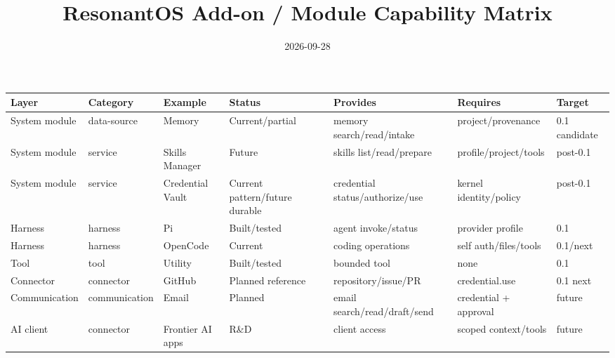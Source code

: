 \documentclass[10pt,landscape]{article}
\title{ResonantOS Add-on / Module Capability Matrix}\date{2026-09-28}
\begin{document}
\maketitle
\small
\begin{longtable}{p{2.2cm}p{2cm}p{2.6cm}p{2.5cm}p{3.4cm}p{3.4cm}p{2.6cm}}
\textbf{Layer}&\textbf{Category}&\textbf{Example}&\textbf{Status}&\textbf{Provides}&\textbf{Requires}&\textbf{Target}\\\hline
System module&data-source&Memory&Current/partial&memory search/read/intake&project/provenance&0.1 candidate\\
System module&service&Skills Manager&Future&skills list/read/prepare&profile/project/tools&post-0.1\\
System module&service&Credential Vault&Current pattern/future durable&credential status/authorize/use&kernel identity/policy&post-0.1\\
Harness&harness&Pi&Built/tested&agent invoke/status&provider profile&0.1\\
Harness&harness&OpenCode&Current&coding operations&self auth/files/tools&0.1/next\\
Tool&tool&Utility&Built/tested&bounded tool&none&0.1\\
Connector&connector&GitHub&Planned reference&repository/issue/PR&credential.use&0.1 next\\
Communication&communication&Email&Planned&email search/read/draft/send&credential + approval&future\\
AI client&connector&Frontier AI apps&R\&D&client access&scoped context/tools&future\\
\end{longtable}
\end{document}
